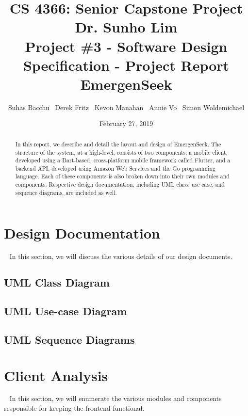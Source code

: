\documentclass[10pt, a4paper]{article}
\title{\large CS 4366: Senior Capstone Project \\ Dr. Sunho Lim \\ Project \#3 - Software Design Specification - Project Report \\ EmergenSeek}
\author{Suhas Bacchu \ Derek Fritz \ Kevon Manahan \ Annie Vo \ Simon Woldemichael}
\date{February 27, 2019}
\begin{document}
\maketitle
\vspace{-1cm}
\begin{abstract}
In this report, we describe and detail the layout and design of EmergenSeek. The structure of the system, at a high-level, consists of two components; a mobile client, developed using a Dart-based, cross-platform mobile framework called Flutter, and a backend API, developed using Amazon Web Services and the Go programming language. Each of these components is also broken down into their own modules and components. Respective design documentation, including UML class, use case, and sequence diagrams, are included as well.
\end{abstract}

\section{Design Documentation}
\par ~ In this section, we will discuss the various details of our design documents.

\subsection{UML Class Diagram}
\subsection{UML Use-case Diagram}
\subsection{UML Sequence Diagrams}

\section{Client Analysis}
\par ~ In this section, we will enumerate the various modules and components responsible for keeping the frontend functional.
\end{document}
